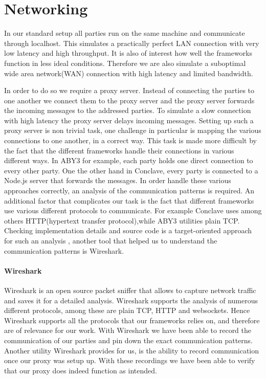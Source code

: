 \section{Networking}
In our standard setup all parties run on the same machine and communicate through localhost. This simulates a practically perfect LAN connection with very low latency and high throughput. It is also of interest how well the frameworks function in less ideal conditions. Therefore we are also simulate a suboptimal wide area network(WAN) connection with high latency and limited bandwidth.

In order to do so we require a proxy server. Instead of connecting the parties to one another we connect them to the proxy server and the proxy server forwards the incoming messages to the addressed parties. To simulate a slow connection with high latency the proxy server delays incoming messages. Setting up such a proxy server is non trivial task, one challenge in particular is mapping the various connections to one another, in a correct way. This task is made more difficult by the fact that the different frameworks handle their connections in various different ways. In ABY3 for example, each party holds one direct connection to every other party. One the other hand in Conclave, every party is connected to a Node.js server that forwards the messages. In order handle these various approaches correctly, an analysis of the communication patterns is required. An additional factor that complicates our task is the fact that different frameworks use various different protocols to communicate. For example Conclave uses among others HTTP(hypertext transfer protocol),while ABY3 utilities plain TCP. Checking implementation details and source code is a target-oriented approach for such an analysis , another tool that helped us to understand the communication patterns is Wireshark.      
\paragraph{Wireshark}
Wireshark \cite{wireshark} is an open source packet sniffer that allows to capture network traffic and saves it for a detailed analysis. Wireshark supports the analysis of numerous different protocols, among these are plain TCP, HTTP and websockets. Hence Wireshark supports all the protocols that our frameworks relies on, and therefore are of relevance for our work. With Wireshark we have been able to record the communication of our parties and pin down the exact communication patterns. Another utility Wireshark provides for us, is the ability to record communication once our proxy was setup up. With these recordings we have been able to verify that our proxy does indeed function as intended.                  

